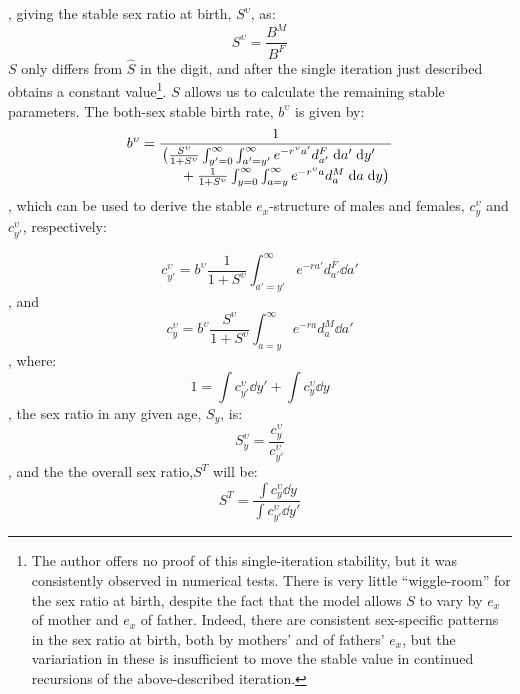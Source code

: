, giving the stable sex ratio at birth, $S^\upsilon$, as:
\begin{equation}
S^\upsilon = \frac{B^M}{B^F}
\end{equation}
$S$ only differs from $\hat{S}$ in the  digit, and after the single
iteration just described obtains a constant value\footnote{The author offers
no proof of this single-iteration stability, but it was consistently observed
in numerical tests. There is very little ``wiggle-room'' for the sex ratio at
birth, despite the fact that the model allows $S$ to vary by $e_x$ of mother and
$e_x$ of father. Indeed, there are consistent sex-specific patterns in the sex ratio
at birth, both by mothers' and of fathers' $e_x$, but the
variariation in these is insufficient to move the stable value in continued
recursions of the above-described iteration.}. $S$ allows us to calculate the
remaining stable parameters. The both-sex stable birth rate, $b^\upsilon$ is given by:
\begin{equation}
b^\upsilon = \frac{1}{
            \splitfrac{\big(\frac{S^\upsilon}{1+S^\upsilon} \int _{y'=0}^\infty
            \int _{a'=y'}^\infty e^{-r^\upsilon a'} d_{a'}^F \dd a' \dd y'}{ + 
             \frac{1}{1+S^\upsilon} \int _{y=0}^\infty \int _{a=y}^\infty
             e^{-r^\upsilon a} d_{a}^M \dd a \dd y\big)}  }                   
\end{equation}
, which can be used to derive the stable $e_x$-structure of males and females,
$c_y^\upsilon$ and $c_{y'}^\upsilon$, respectively:

\begin{equation}
c_{y'}^\upsilon = b^\upsilon \frac{1}{1+S^\upsilon} \int _{a'=y'}^\infty
e^{-ra'} d_{a'}^F \dd a'
\end{equation}
, and
\begin{equation}
c_{y}^\upsilon = b^\upsilon \frac{S^\upsilon}{1+S^\upsilon} \int _{a=y}^\infty
e^{-ra} d_{a}^M \dd a'
\end{equation}
, where:
\begin{equation}
1 = \int c_{y'}^\upsilon \dd y' + \int c_{y}^\upsilon \dd y
\end{equation}
, the sex ratio in any given age, $S_y$, is:
\begin{equation}
S_y^\upsilon = \frac{c_{y}^\upsilon}{c_{y'}^\upsilon}
\end{equation}
, and the the overall sex ratio,$S^T$ will be:
\begin{equation}
S^T= \frac{\int c_{y}^\upsilon \dd y}{\int c_{y'}^\upsilon \dd y'}
\end{equation}